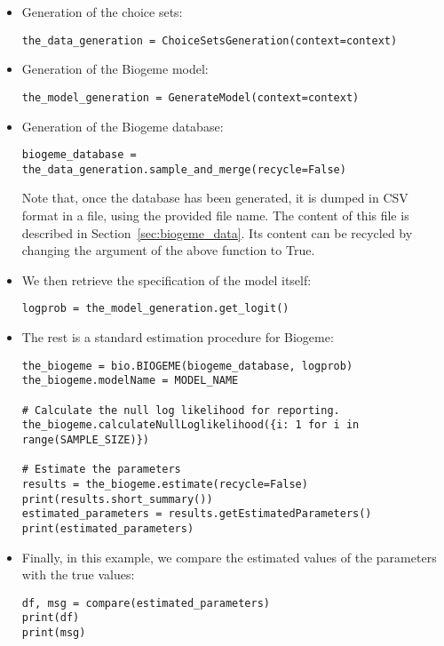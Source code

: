 \documentclass[12pt,a4paper]{article}
\begin{document}
\begin{itemize}
\item Generation of the choice sets:
  \begin{lstlisting}
the_data_generation = ChoiceSetsGeneration(context=context)
  \end{lstlisting}
\item Generation of the Biogeme model:
  \begin{lstlisting}
the_model_generation = GenerateModel(context=context)
  \end{lstlisting}
\item Generation of the Biogeme database:
  \begin{lstlisting}
biogeme_database = the_data_generation.sample_and_merge(recycle=False)
  \end{lstlisting}

Note that, once the database has been generated, it is dumped in CSV
format in a file, using the provided file name. The content of this
file is described in Section~\ref{sec:biogeme_data}. Its content can be
recycled by changing the argument of the above function to True.
  
\item We then retrieve the specification of the model itself:
  \begin{lstlisting}
logprob = the_model_generation.get_logit()
  \end{lstlisting}
\item The rest is a standard estimation procedure for Biogeme:
  \begin{lstlisting}
the_biogeme = bio.BIOGEME(biogeme_database, logprob)
the_biogeme.modelName = MODEL_NAME

# Calculate the null log likelihood for reporting.
the_biogeme.calculateNullLoglikelihood({i: 1 for i in range(SAMPLE_SIZE)})

# Estimate the parameters
results = the_biogeme.estimate(recycle=False)
print(results.short_summary())
estimated_parameters = results.getEstimatedParameters()
print(estimated_parameters)
  \end{lstlisting}
\item Finally, in this example, we compare the estimated values of the parameters with the true values:
  \begin{lstlisting}
df, msg = compare(estimated_parameters)
print(df)
print(msg)
  \end{lstlisting}
\end{itemize}
\end{document}
